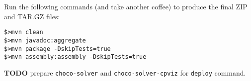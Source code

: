 \documentclass[11pt]{amsart}
\newcommand{\mylst}[1]{\lstinline|#1|}
\begin{document}
\vspace{.5cm}
Run the following commands (and take another coffee) to produce the final ZIP and TAR.GZ files:
\begin{lstlisting}
$>mvn clean
$>mvn javadoc:aggregate
$>mvn package -DskipTests=true
$>mvn assembly:assembly -DskipTests=true
\end{lstlisting}

\textbf{TODO} prepare \mylst{choco-solver} and \mylst{choco-solver-cpviz} for \mylst{deploy} command.

\end{document}

